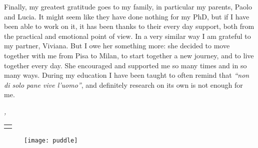Finally, my greatest gratitude goes to my family, in particular my parents,
Paolo and Lucia.
It might seem like they have done nothing for my PhD, but if I have been able
to work on it, it has been thanks to their every day support, both from the
practical and emotional point of view.
%
In a very similar way I am grateful to my partner, Viviana. But I owe her
something more: she decided to move together with me from Pisa to Milan, to
start together a new journey, and to live together every day.
She encouraged and supported me so many times and in so many ways.
%
During my education I have been taught to often remind that
\textit{\enquote{non di solo pane vive l'uomo}}, and definitely research on its
own is not enough for me.

\bigskip
\bigskip
 
\noindent\textit{\myLocation, \MakeTextLowercase{\myTime}}

\smallskip
\vspace*{-20pt}

\begin{flushright}
	\begin{tabular}{m{5cm}}
		\\ \hline
		\centering\myName \\
	\end{tabular}
\end{flushright}

\vfill

\pagebreak

\vfill

\begin{figure}
	\centering
	\texttt{[image: puddle]}
\end{figure}

\vfill
